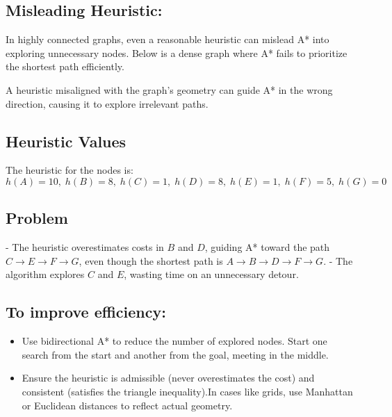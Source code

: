 \documentclass{article}
\begin{document}
\subsection*{Misleading Heuristic:}
In highly connected graphs, even a reasonable heuristic can mislead A* into exploring unnecessary nodes. Below is a dense graph where A* fails to prioritize the shortest path efficiently.

A heuristic misaligned with the graph's geometry can guide A* in the wrong direction, causing it to explore irrelevant paths.

\subsection*{Heuristic Values}
The heuristic for the nodes is:
\[
h(A) = 10, \; h(B) = 8, \; h(C) = 1, \; h(D) = 8, \; h(E) = 1, \; h(F) = 5, \; h(G) = 0
\]

\subsection*{Problem}
- The heuristic overestimates costs in \( B \) and \( D \), guiding A* toward the path \( C \to E \to F \to G \), even though the shortest path is \( A \to B \to D \to F \to G \).
- The algorithm explores \( C \) and \( E \), wasting time on an unnecessary detour.

\begin{center}
    \end{center}
\subsection*{To improve efficiency:}
\begin{itemize}
    \item Use bidirectional A* to reduce the number of explored nodes. Start one search from the start and another from the goal, meeting in the middle.
    \item Ensure the heuristic is admissible (never overestimates the cost) and consistent (satisfies the triangle inequality).In cases like grids, use Manhattan or Euclidean distances to reflect actual geometry.
\end{itemize}
\end{document}
